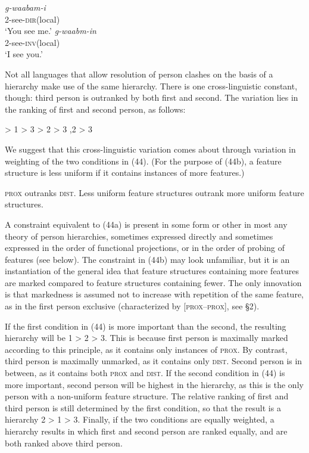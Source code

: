 \documentclass[output=paper]{langsci/langscibook}
\begin{document}
\ea 
  \ea
 \gll     \textit{g-waabam-i}      \\
           \textsc{2}-see-\textsc{dir}(local)  \\
 \glt      ‘You see me.’
 \ex
   \gll  \textit{g-waabm-in}\\
         \textsc{2}-see-\textsc{inv}(local)\\
   \glt   ‘I see you.’
\z
  \z

Not all languages that allow resolution of person clashes on the basis of a hierarchy make use of the same hierarchy. There is one cross-linguistic constant, though: third person is outranked by both first and second. The variation lies in the ranking of first and second person, as follows:

\ea \settowidth{}
 > 1 > 3  
 > 2 > 3  
,2 > 3    
\z
\z
{}

We suggest that this cross-linguistic variation comes about through variation in weighting of the two conditions in (44). (For the purpose of (44b), a feature structure is less uniform if it contains instances of more features.)

\ea \label{bkm:Ref453928502}  
\ea  \textsc{prox} outranks \textsc{dist}.
\ex  Less uniform feature structures outrank more uniform feature structures.
\z
\z

A constraint equivalent to (44a) is present in some form or other in most any theory of person hierarchies, sometimes expressed directly and sometimes expressed in the order of functional projections, or in the order of probing of features (see below). The constraint in (44b) may look unfamiliar, but it is an instantiation of the general idea that feature structures containing more features are marked compared to feature structures containing fewer. The only innovation is that markedness is assumed not to increase with repetition of the same feature, as in the first person exclusive (characterized by [\textsc{prox}–\textsc{prox}], see §2).

If the first condition in (44) is more important than the second, the resulting hierarchy will be 1 > 2 > 3. This is because first person is maximally marked according to this principle, as it contains only instances of \textsc{prox}. By contrast, third person is maximally unmarked, as it contains only \textsc{dist}. Second person is in between, as it contains both \textsc{prox} and \textsc{dist}. If the second condition in (44) is more important, second person will be highest in the hierarchy, as this is the only person with a non-uniform feature structure. The relative ranking of first and third person is still determined by the first condition, so that the result is a hierarchy 2 > 1 > 3. Finally, if the two conditions are equally weighted, a hierarchy results in which first and second person are ranked equally, and are both ranked above third person.
\end{document}
